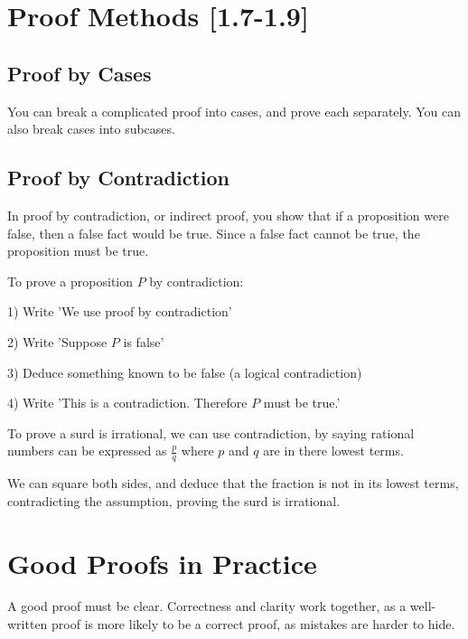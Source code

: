 \section{Proof Methods [1.7-1.9]}

\subsection{Proof by Cases}

You can break a complicated proof into cases, and prove each separately. You can also break cases into subcases.

\subsection{Proof by Contradiction}

In proof by contradiction, or indirect proof, you show that if a proposition were false, then a false fact would be true. Since a false fact cannot be true, the proposition must be true.

\vspace{1mm}

To prove a proposition \(P\) by contradiction:

1) Write 'We use proof by contradiction'

2) Write 'Suppose \(P\) is false'

3) Deduce something known to be false (a logical contradiction)

4) Write 'This is a contradiction. Therefore \(P\) must be true.'

\vspace{1mm}

To prove a surd is irrational, we can use contradiction, by saying rational numbers can be expressed as \(\frac{p}{q}\) where \(p\) and \(q\) are in there lowest terms.

We can square both sides, and deduce that the fraction is not in its lowest terms, contradicting the assumption, proving the surd is irrational.

\section{Good Proofs in Practice}

A good proof must be clear. Correctness and clarity work together, as a well-written proof is more likely to be a correct proof, as mistakes are harder to hide.

